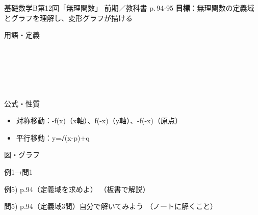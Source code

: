 \documentclass[aspectratio=43,professionalfonts,handout]{beamer}
\newcommand{\LectureNum}{12}
\newcommand{\LectureTitle}{無理関数}
\newcommand{\TextPages}{p.\,94-95}
\newcommand{\CourseName}{基礎数学B}
\renewcommand{\TermName}{前期}
\begin{document}
\begin{frame}{\CourseName\quad 第\LectureNum 回「\LectureTitle 」}
  {\small \TermName\quad \TeacherName\quad ／\quad 教科書 \TextPages\quad
  \textbf{目標}：無理関数の定義域とグラフを理解し、変形グラフが描ける}

  \begin{block}{用語・定義}
  \begin{description}[labelwidth=5.5em]
    \item[\kw{無理関数}] ~
    \item[\kw{定義域（P(x)≧0）}] ~
    \item[\kw{y=√x のグラフ}] ~
  \end{description}
  \end{block}
\end{frame}

\begin{frame}{公式・性質}
  \begin{block}{}
  \begin{itemize}
    \item 対称移動：-f(x)（x軸）、f(-x)（y軸）、-f(-x)（原点）
    \item 平行移動：y=√(x-p)+q
  \end{itemize}
  \end{block}
\end{frame}

\begin{frame}{図・グラフ}
  \centering
\end{frame}

\begin{frame}{例1→問1}
  \begin{exampleblock}{例5) p.94（定義域を求めよ）}
    （板書で解説）
  \end{exampleblock}

  \vfill

  \begin{block}{問5) p.94（定義域3問）\quad 自分で解いてみよう}
    （ノートに解くこと）
  \end{block}
\end{frame}
\end{document}
